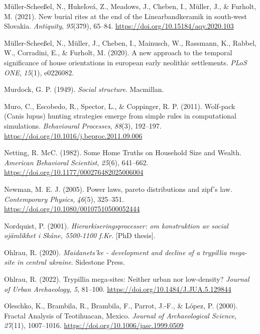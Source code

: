 \documentclass[
  12pt,
]{book}
\newlength{\cslhangindent}
\newlength{\cslentryspacingunit} %
\newenvironment{CSLReferences}[2] %
 {%
  \setlength{\parindent}{0pt}
  \ifodd #1
  \let\oldpar\par
  \def\par{\hangindent=\cslhangindent\oldpar}
  \fi
  \setlength{\parskip}{#2\cslentryspacingunit}
 }%
 {}
\begin{document}
\begin{CSLReferences}{1}{0}
\leavevmode{}%
Müller-Scheeßel, N., Hukeľová, Z., Meadows, J., Cheben, I., Müller, J., \& Furholt, M. (2021). New burial rites at the end of the {Linearbandkeramik} in south-west {Slovakia}. \emph{Antiquity}, \emph{95}(379), 65--84. \url{https://doi.org/10.15184/aqy.2020.103}

\leavevmode{}%
Müller-Scheeßel, N., Müller, J., Cheben, I., Mainusch, W., Rassmann, K., Rabbel, W., Corradini, E., \& Furholt, M. (2020). A new approach to the temporal significance of house orientations in european early neolithic settlements. \emph{PLoS ONE}, \emph{15}(1), e0226082.

\leavevmode{}%
Murdock, G. P. (1949). \emph{Social structure}. Macmillan.

\leavevmode{}%
Muro, C., Escobedo, R., Spector, L., \& Coppinger, R. P. (2011). Wolf-pack (Canis lupus) hunting strategies emerge from simple rules in computational simulations. \emph{Behavioural Processes}, \emph{88}(3), 192--197. \url{https://doi.org/10.1016/j.beproc.2011.09.006}

\leavevmode{}%
Netting, R. McC. (1982). Some Home Truths on Household Size and Wealth. \emph{American Behavioral Scientist}, \emph{25}(6), 641--662. \url{https://doi.org/10.1177/000276482025006004}

\leavevmode{}%
Newman, M. E. J. (2005). Power laws, pareto distributions and zipf's law. \emph{Contemporary Physics}, \emph{46}(5), 325--351. \url{https://doi.org/10.1080/00107510500052444}

\leavevmode{}%
Nordquist, P. (2001). \emph{Hierarkiseringsprocesser: om konstruktion av social ojämlikhet i Skåne, 5500-1100 f.Kr.} {[}PhD thesis{]}.

\leavevmode{}%
Ohlrau, R. (2020). \emph{Maidanets'ke - development and decline of a trypillia mega-site in central ukraine}. Sidestone Press.

\leavevmode{}%
Ohlrau, R. (2022). Trypillia mega-sites: Neither urban nor low-density? \emph{Journal of Urban Archaeology}, \emph{5}, 81--100. \url{https://doi.org/10.1484/J.JUA.5.129844}

\leavevmode{}%
Oleschko, K., Brambila, R., Brambila, F., Parrot, J.-F., \& López, P. (2000). Fractal Analysis of Teotihuacan, Mexico. \emph{Journal of Archaeological Science}, \emph{27}(11), 1007--1016. \url{https://doi.org/10.1006/jasc.1999.0509}


\end{CSLReferences}
\end{document}
